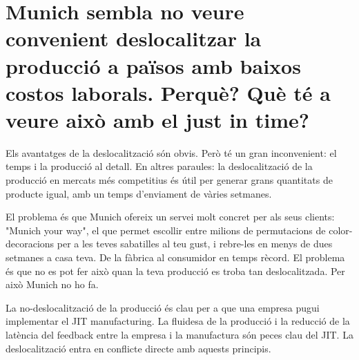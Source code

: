 \section{Munich sembla no veure convenient deslocalitzar la producció a 
països amb baixos costos laborals.
Perquè? Què té a veure això amb el just in time?}

Els avantatges de la deslocalització són obvis. Però té un gran inconvenient:
el temps i la producció al detall. En altres paraules: la deslocalització de
la producció en mercats més competitius és útil per generar grans quantitats
de producte igual, amb un temps d'enviament de vàries setmanes.

El problema és que Munich ofereix un servei molt concret per als seus clients:
"Munich your way", el que permet escollir entre milions de permutacions de
color-decoracions per a les teves sabatilles al teu gust, i rebre-les en menys
de dues setmanes a casa teva. De la fàbrica al consumidor en temps rècord. El
problema és que no es pot fer això quan la teva producció es troba tan 
deslocalitzada. Per això Munich no ho fa.

La no-deslocalització de la producció és clau per a que una empresa pugui
implementar el JIT manufacturing. La fluidesa de la producció i la reducció
de la latència del feedback entre la empresa i la manufactura són peces clau
del JIT. La deslocalització entra en conflicte directe amb aquests principis.
